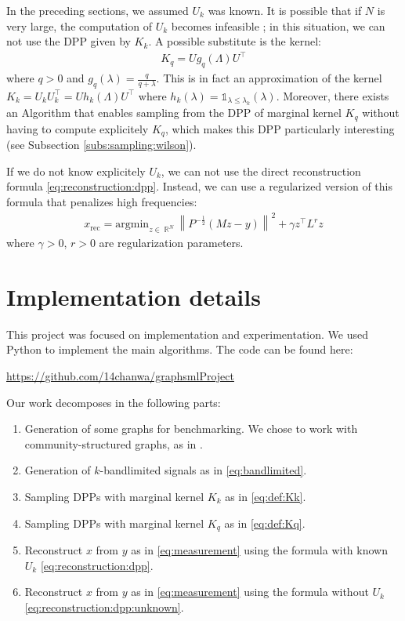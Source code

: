 \documentclass{article}
\newcommand{\norm}[1]{\left\|#1\right\|}
\DeclareMathOperator{\R}{\mathbb{R}}
\begin{document}
In the preceding sections, we assumed $U_k$ was known. It is possible that if $N$ is very large, the computation of $U_k$ becomes infeasible ; in this situation, we can not use the DPP given by $K_k$. A possible substitute is the kernel:
\begin{align} \boxed{K_q = U g_q(\Lambda) U^\top} \label{eq:def:Kq}\end{align}
where $q > 0$ and $g_q(\lambda) = \frac{q}{q + \lambda}$. This is in fact an approximation of the kernel $K_k = U_k U_k^\top = U h_k(\Lambda) U^\top$ where $h_k(\lambda) = \mathds{1}_{\lambda \leq \lambda_k} (\lambda)$. Moreover, there exists an Algorithm that enables sampling from the DPP of marginal kernel $K_q$ without having to compute explicitely $K_q$, which makes this DPP particularly interesting (see Subsection \ref{subs:sampling:wilson}).


If we do not know explicitely $U_k$, we can not use the direct reconstruction formula \eqref{eq:reconstruction:dpp}. Instead, we can use a regularized version of this formula that penalizes high frequencies:
\begin{align} \boxed{x_{\text{rec}} = \mathrm{argmin}_{z \in \R^N} \norm{P^{-\frac{1}{2}} \left( M z - y \right)}^2 + \gamma z^\top L^r z} \label{eq:reconstruction:dpp:unknown}\end{align}
where $\gamma > 0$, $r > 0$ are regularization parameters.

\section{Implementation details}


This project was focused on implementation and experimentation. We used Python to implement the main algorithms. The code can be found here:
\begin{center}
  \url{https://github.com/14chanwa/graphsmlProject}
\end{center}


Our work decomposes in the following parts:
\begin{enumerate}
\item Generation of some graphs for benchmarking. We chose to work with community-structured graphs, as in \cite{tremblay2017}.
\item Generation of $k$-bandlimited signals as in \eqref{eq:bandlimited}.
\item Sampling DPPs with marginal kernel $K_k$ as in \eqref{eq:def:Kk}.
\item Sampling DPPs with marginal kernel $K_q$ as in \eqref{eq:def:Kq}.
\item Reconstruct $x$ from $y$ as in \eqref{eq:measurement} using the formula with known $U_k$ \eqref{eq:reconstruction:dpp}.
\item Reconstruct $x$ from $y$ as in \eqref{eq:measurement} using the formula without $U_k$ \eqref{eq:reconstruction:dpp:unknown}.
\end{enumerate}
\end{document}

